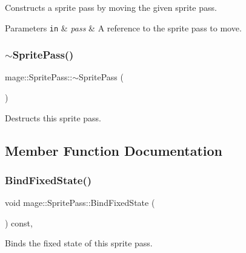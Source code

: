 Constructs a sprite pass by moving the given sprite pass.


\begin{DoxyParams}[1]{Parameters}
\mbox{\tt in}  & {\em pass} & A reference to the sprite pass to move. \\
\hline
\end{DoxyParams}
\hypertarget{classmage_1_1_sprite_pass_a70a866324750c21196d80364e9a0e309}{}\label{classmage_1_1_sprite_pass_a70a866324750c21196d80364e9a0e309} 
\subsubsection{\texorpdfstring{$\sim$\+Sprite\+Pass()}{~SpritePass()}}
{\footnotesize\ttfamily mage\+::\+Sprite\+Pass\+::$\sim$\+Sprite\+Pass (\begin{DoxyParamCaption}{ }\end{DoxyParamCaption})\hspace{0.3cm}{\ttfamily [default]}}

Destructs this sprite pass. 

\subsection{Member Function Documentation}
\hypertarget{classmage_1_1_sprite_pass_accdad82309711cb5248d61de1a85c8d1}{}\label{classmage_1_1_sprite_pass_accdad82309711cb5248d61de1a85c8d1} 
\subsubsection{\texorpdfstring{Bind\+Fixed\+State()}{BindFixedState()}}
{\footnotesize\ttfamily void mage\+::\+Sprite\+Pass\+::\+Bind\+Fixed\+State (\begin{DoxyParamCaption}{ }\end{DoxyParamCaption}) const\hspace{0.3cm}{\ttfamily [private]}, {\ttfamily [noexcept]}}

Binds the fixed state of this sprite pass. \hypertarget{classmage_1_1_sprite_pass_a0044e0756f5f96f24c188424f9769a02}{}\label{classmage_1_1_sprite_pass_a0044e0756f5f96f24c188424f9769a02} 
